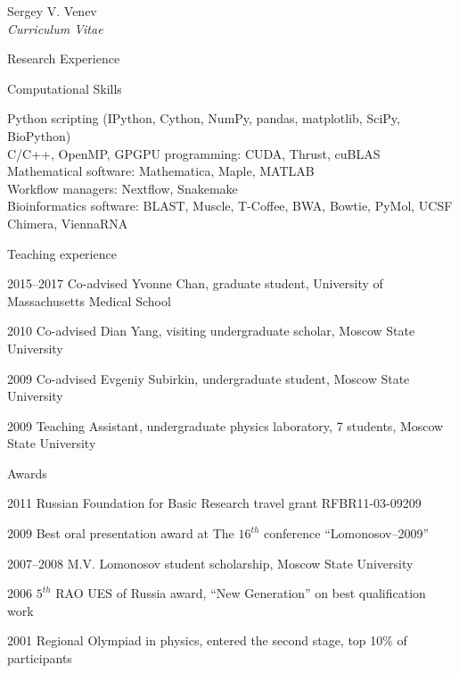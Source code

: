 \documentclass[10pt]{article}
\newenvironment{sublist}{%
    \begin{list}{}{%
        \setlength{\itemsep}{0em}\setlength{\parsep}{0em}%
        \setlength{\topsep}{0em}\setlength{\parskip}{0em}%
    }%
}%
{ \end{list} }
\begin{document}
\begin{cv}{Sergey V. Venev\\{\large \itshape Curriculum Vitae}}
\begin{cvlist}{Research Experience}
\end{cvlist}
\setlength{\cvlabelwidth}{\oldcvlabelwidth}



\setlength{\oldcvlabelwidth}{\cvlabelwidth}
\setlength{\cvlabelwidth}{1em}
\begin{cvlist}{Computational Skills}
        \item Python scripting (IPython, Cython, NumPy, pandas, matplotlib, SciPy, BioPython)\\
        C/C++, OpenMP, GPGPU programming: CUDA, Thrust, cuBLAS\\
        Mathematical software: Mathematica, Maple, MATLAB\\
        Workflow managers: Nextflow, Snakemake\\
        Bioinformatics software: BLAST, Muscle, T-Coffee, BWA, Bowtie, PyMol, UCSF Chimera, ViennaRNA
\end{cvlist}
\setlength{\cvlabelwidth}{\oldcvlabelwidth}




\setlength{\oldcvlabelwidth}{\cvlabelwidth}
\setlength{\cvlabelwidth}{1em}
\begin{cvlist}{Teaching experience}
        \item[2015--2017] Co-advised Yvonne Chan, graduate student, University of Massachusetts Medical School
        \item[2010] Co-advised Dian Yang, visiting undergraduate scholar, Moscow State University
        \item[2009] Co-advised Evgeniy Subirkin, undergraduate student, Moscow State University
        \item[2009] Teaching Assistant, undergraduate physics laboratory, 7 students, Moscow State University
\end{cvlist}
\setlength{\cvlabelwidth}{\oldcvlabelwidth}



\begin{cvlist}{Awards}
    \item[2011] Russian Foundation for Basic Research travel grant RFBR11-03-09209  
    \item[2009] Best oral presentation award at The $16^{th}$ conference ``Lomonosov--2009''  
    \item[2007--2008] M.V. Lomonosov student scholarship, Moscow State University  
    \item[2006] $5^{th}$ RAO UES of Russia award, ``New Generation'' on best qualification work 
    \item[2001] Regional Olympiad in physics, entered the second stage, top 10\% of participants
\end{cvlist}



\end{cv}
\end{document}
